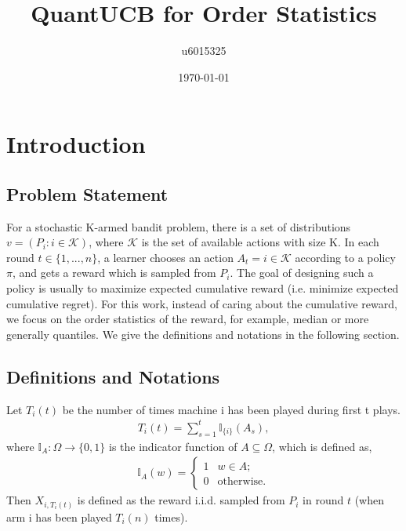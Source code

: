 \documentclass{article}
\title{QuantUCB for Order Statistics}
\author{u6015325 }
\date{\today}
\theoremstyle{plain}
\begin{document}
\maketitle

\section{Introduction}

\subsection{Problem Statement}

    For a stochastic K-armed bandit problem, there is a set of distributions $v = (P_i: i \in \mathcal{K})$, where $\mathcal{K}$ is the set of available actions with size K. In each round $t \in \{1, ..., n\}$, a learner chooses an action $A_t = i \in \mathcal{K}$ according to a policy $\pi$, and gets a reward which is sampled from $P_i$. The goal of designing such a policy is usually to maximize expected cumulative reward (i.e. minimize expected cumulative regret). For this work, instead of caring about the cumulative reward, we focus on the order statistics of the reward, for example, median or more generally quantiles. We give the definitions and notations in the following section. 
    
\subsection{Definitions and Notations}
    
    Let $T_i(t)$ be the number of times machine i has been played during first t plays. 
    \begin{align}
        T_i(t) = \sum_{s = 1}^t \mathbb{I}_{\{i\}} (A_s),
    \end{align}
    where $\mathbb{I}_A: \Omega\rightarrow \{0,1\}$ is the indicator function of $A \subseteq \Omega$, which is defined as, 
    \begin{align}
        \mathbb{I}_A(w) = \begin{cases}
                            1 & w \in A;\\
                            0 & \text{otherwise}.
                            \end{cases}
    \end{align}
    Then $X_{i,T_i(t)}$ is defined as the reward i.i.d. sampled from $P_i$ in round $t$ (when arm i has been played $T_i(n)$ times). \\
    
\end{document}
